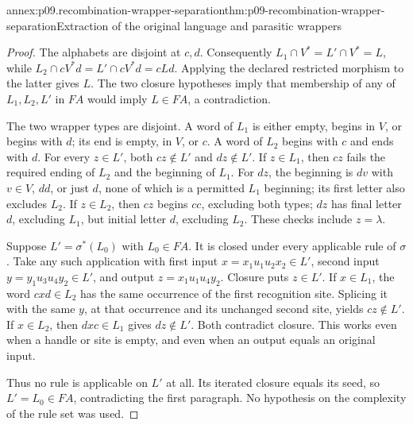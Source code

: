 \begin{annexitem}{annex:p09.recombination-wrapper-separation}{thm:p09-recombination-wrapper-separation}{Extraction of the original language and parasitic wrappers}
\begin{proof}
The alphabets are disjoint at \(c,d\). Consequently
\(L_1\cap V^*=L'\cap V^*=L\), while
\(L_2\cap cV^*d=L'\cap cV^*d=cLd\).
Applying the declared restricted morphism to the latter gives \(L\).
The two closure hypotheses imply that membership of any of \(L_1,L_2,L'\)
in \(FA\) would imply \(L\in FA\), a contradiction.

The two wrapper types are disjoint. A word of \(L_1\) is either empty,
begins in \(V\), or begins with \(d\); its end is empty, in \(V\),
or \(c\). A word of \(L_2\) begins with \(c\) and ends with \(d\).
For every \(z\in L'\), both \(cz\notin L'\) and \(dz\notin L'\).
If \(z\in L_1\), then \(cz\) fails the required ending of \(L_2\)
and the beginning of \(L_1\). For \(dz\), the beginning is \(dv\)
with \(v\in V\), \(dd\), or just \(d\), none of which is a permitted
\(L_1\) beginning; its first letter also excludes \(L_2\).
If \(z\in L_2\), then \(cz\) begins \(cc\), excluding both types;
\(dz\) has final letter \(d\), excluding \(L_1\), but initial letter
\(d\), excluding \(L_2\). These checks include \(z=\lambda\).

Suppose \(L'=\sigma^*(L_0)\) with \(L_0\in FA\).
It is closed under every applicable rule of \(\sigma\).
Take any such application with first input
\(x=x_1u_1u_2x_2\in L'\), second input
\(y=y_1u_3u_4y_2\in L'\), and output \(z=x_1u_1u_4y_2\).
Closure puts \(z\in L'\).
If \(x\in L_1\), the word \(cxd\in L_2\) has the same occurrence
of the first recognition site. Splicing it with the same \(y\), at
that occurrence and its unchanged second site, yields \(cz\notin L'\).
If \(x\in L_2\), then \(dxc\in L_1\) gives \(dz\notin L'\).
Both contradict closure. This works even when a handle or site is empty,
and even when an output equals an original input.

Thus no rule is applicable on \(L'\) at all. Its iterated closure equals
its seed, so \(L'=L_0\in FA\), contradicting the first paragraph.
No hypothesis on the complexity of the rule set was used.
\end{proof}
\end{annexitem}

